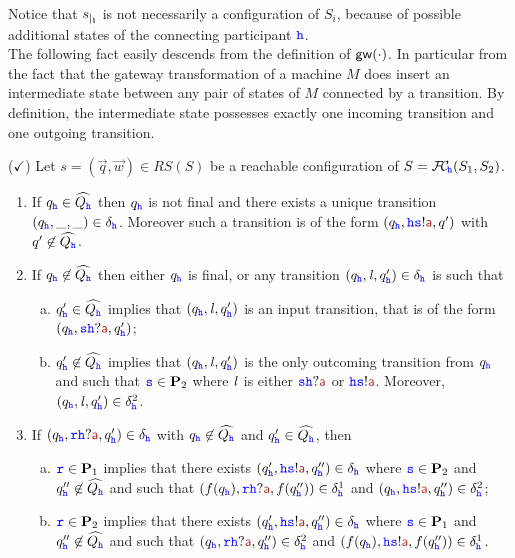 Notice that ${s}_{\mid_{\mathbf{i}}}$ is not necessarily a configuration of $S_i$, because of possible additional states of the connecting participant ${\mathtt{\color{blue}{ {h}}}}$.\\


The following fact easily descends from the definition of $\mathsf{gw}(\cdot)$.
In particular from the fact that the gateway transformation of a machine $M$ does insert an intermediate state
 between any pair of states of $M$ connected by a transition. By definition, the intermediate state
 possesses exactly one incoming transition and one outgoing transition. 

\begin{fact}($\checkmark$)
\label{fact:uniquesending}
Let $s= (\vec{q},\vec{w}) \in RS(S)$ be a reachable configuration of
$S ={\mathcal{F}\!\mathcal{C}}_{\!{\mathtt{\color{blue}{ {h}}}}}(S_1,S_2)$.
\begin{enumerate}
\item
\label{fact:uniquesending-i}
If ${q_{\mathtt{\color{blue}{ {h}}}}} \in\widehat{Q_{\mathtt{\color{blue}{ {h}}}}}$ then
${q_{\mathtt{\color{blue}{ {h}}}}}$ is not final and
 there exists a unique transition $({q_{\mathtt{\color{blue}{ {h}}}}},\_,\_)\in\delta_{\mathtt{\color{blue}{ {h}}}}$.
  Moreover such a transition is of the form
 $(q_\HH,\HH\tts!\msg[a],q')$ with $q'\not\in\widehat{Q_{\mathtt{\color{blue}{ {h}}}}}$.

\item
\label{fact:uniquesending-ii}
 If ${q_{\mathtt{\color{blue}{ {h}}}}}\not\in\widehat{Q_{\mathtt{\color{blue}{ {h}}}}}$ then either $q_{\mathtt{\color{blue}{ {h}}}}$ is final, 
or any transition $({q_{\mathtt{\color{blue}{ {h}}}}},\mathit{l},q'_{\mathtt{\color{blue}{ {h}}}})\in\delta_{\mathtt{\color{blue}{ {h}}}}$ is such that 
\begin{enumerate}[a)]
\item
${q'_{\mathtt{\color{blue}{ {h}}}}}\in\widehat{Q_{\mathtt{\color{blue}{ {h}}}}}$ implies that $({q_{\mathtt{\color{blue}{ {h}}}}},\mathit{l},q'_{\mathtt{\color{blue}{ {h}}}})$
is an input transition, that 
is of the form $({q_\HH},\tts\HH?\msg[a],{q'_\HH})$;
\item
\label{fact:uniquesending-iib}
${q'_{\mathtt{\color{blue}{ {h}}}}}\not\in\widehat{Q_{\mathtt{\color{blue}{ {h}}}}}$ implies that
$({q_{\mathtt{\color{blue}{ {h}}}}},\mathit{l},q'_{\mathtt{\color{blue}{ {h}}}})$ is the only outcoming transition from $q_{\mathtt{\color{blue}{ {h}}}}$ and such that
${\mathtt{\color{blue}{ {s}}}}\in\mathbf{P}_2$ where $\mathit{l}$ is either $\tts\hh?\msg[a]$ or $\hh\tts!\msg[a]$.
Moreover, $({q_{\mathtt{\color{blue}{ {h}}}}},\mathit{l},q'_{\mathtt{\color{blue}{ {h}}}})\in\delta^2_{\mathtt{\color{blue}{ {h}}}}$.
\end{enumerate}
\item
\label{fact:uniquesending-iii}
If $(q_\HH,\ttr\HH?\msg[a],{q'_\HH})\in\delta_\HH$ with $q_{\mathtt{\color{blue}{ {h}}}}\not\in\widehat{Q_{\mathtt{\color{blue}{ {h}}}}}$ and
$q'_{\mathtt{\color{blue}{ {h}}}}\in\widehat{Q_{\mathtt{\color{blue}{ {h}}}}}$, then
\begin{enumerate}[a)]
\item
${\mathtt{\color{blue}{ {r}}}}\in\mathbf{P}_1$ implies that
there exists $({q'_\HH},\HH\tts!\msg[a],q''_\HH)\in\delta_\HH$ where ${\mathtt{\color{blue}{ {s}}}} \in \mathbf{P}_2$ and  
$q''_{\mathtt{\color{blue}{ {h}}}}\not\in\widehat{Q_{\mathtt{\color{blue}{ {h}}}}}$ and 
such that 
$(f(q_\HH),\ttr\HH?\msg[a],f(q''_\HH))\in\delta^1_\HH$ and 
$(q_\HH,\HH\tts!\msg[a],q''_\HH)\in\delta^2_\HH$;
\item
${\mathtt{\color{blue}{ {r}}}}\in\mathbf{P}_2$ implies that
there exists $({q'_\HH},\HH\tts!\msg[a],q''_\HH)\in\delta_\HH$ where ${\mathtt{\color{blue}{ {s}}}} \in \mathbf{P}_1$ and  
$q''_{\mathtt{\color{blue}{ {h}}}}\not\in\widehat{Q_{\mathtt{\color{blue}{ {h}}}}}$ and 
such that 
$(q_\HH,\ttr\HH?\msg[a],q''_\HH)\in\delta^2_\HH$ and 
$(f(q_\HH),\HH\tts!\msg[a],f(q''_\HH))\in\delta^1_\HH$.
\end{enumerate}
\end{enumerate}
\end{fact}

